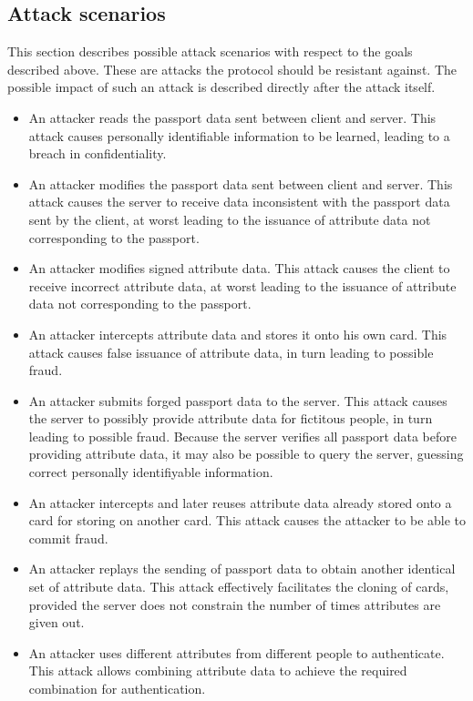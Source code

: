 \subsection{Attack scenarios}
This section describes possible attack scenarios with respect to the goals described above. These are attacks the protocol should be resistant against. The possible impact of such an attack is described directly after the attack itself.

\begin{itemize}
	\item An attacker reads the passport data sent between client and server. This attack causes personally identifiable information to be learned, leading to a breach in confidentiality. 
  \item An attacker modifies the passport data sent between client and server. This attack causes the server to receive data inconsistent with the passport data sent by the client, at worst leading to the issuance of attribute data not corresponding to the passport.
  \item An attacker modifies signed attribute data. This attack causes the client to receive incorrect attribute data, at worst leading to the issuance of attribute data not corresponding to the passport.
  \item An attacker intercepts attribute data and stores it onto his own card. This attack causes false issuance of attribute data, in turn leading to possible fraud.
  \item An attacker submits forged passport data to the server. This attack causes the server to possibly provide attribute data for fictitous people, in turn leading to possible fraud. Because the server verifies all passport data before providing attribute data, it may also be possible to query the server, guessing correct personally identifiyable information.
  \item An attacker intercepts and later reuses attribute data already stored onto a card for storing on another card. This attack causes the attacker to be able to commit fraud.
  \item An attacker replays the sending of passport data to obtain another identical set of attribute data. This attack effectively facilitates the cloning of cards, provided the server does not constrain the number of times attributes are given out.
  \item An attacker uses different attributes from different people to authenticate. This attack allows combining attribute data to achieve the required combination for authentication. 

\end{itemize}
